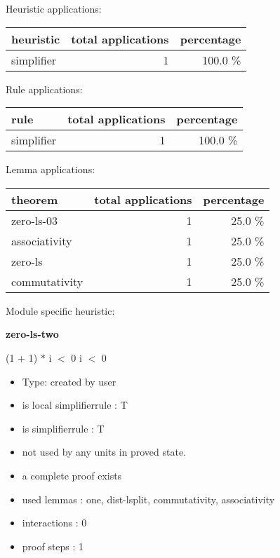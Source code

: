 \documentclass[a4paper]{article}
\begin{document}
\medskip


Heuristic applications:

\begin{supertabular}{l|r|r}
heuristic	& total applications & percentage \\ \hline
simplifier & 1 & 100.0 \% \\

\end{supertabular}

Rule applications:

\begin{supertabular}{l|r|r}
rule	        & total applications & percentage \\ \hline
simplifier & 1 & 100.0 \% \\

\end{supertabular}

Lemma applications:

\begin{supertabular}{l|r|r}
theorem	        & total applications & percentage \\ \hline
zero-ls-03 & 1 & 25.0 \% \\
associativity & 1 & 25.0 \% \\
zero-ls & 1 & 25.0 \% \\
commutativity & 1 & 25.0 \% \\

\end{supertabular}

Module specific heuristic:

\pagebreak

{\LARGE\bf zero-ls-two}\label{lemma-zero-ls-two}

\medskip

 \Fol (1 + 1) $*$ i $<$ 0 \Equiv i $<$ 0

\begin{itemize}

\item Type: created by user

\item is local simplifierrule : T
\item is simplifierrule : T
\item not used by any units in proved state.
\item       a complete proof exists
\item       used lemmas  : one, dist-lsplit, commutativity, associativity
\item       interactions : 0
\item       proof steps  : 1
\end{itemize}
\end{document}
